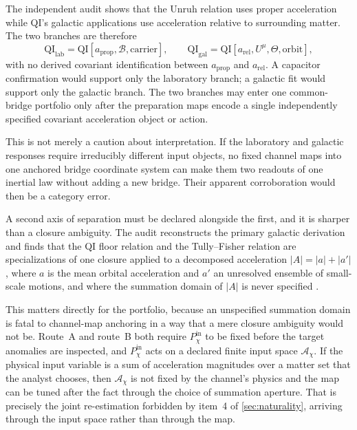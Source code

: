 \documentclass[11pt]{article}
\newcommand{\Bdy}{\mathcal{B}}
\begin{document}
The independent audit shows that the Unruh relation uses proper acceleration while QI's galactic applications use acceleration relative to surrounding matter. The two branches are therefore
\begin{equation}
\mathrm{QI}_{\mathrm{lab}}
=\mathrm{QI}[a_{\mathrm{prop}},\Bdy,\text{carrier}],
\qquad
\mathrm{QI}_{\mathrm{gal}}
=\mathrm{QI}[a_{\mathrm{rel}},U^{\mu},\Theta,\text{orbit}],
\end{equation}
with no derived covariant identification between \(a_{\mathrm{prop}}\) and \(a_{\mathrm{rel}}\). A capacitor confirmation would support only the laboratory branch; a galactic fit would support only the galactic branch. The two branches may enter one common-bridge portfolio only after the preparation maps encode a single independently specified covariant acceleration object or action.

This is not merely a caution about interpretation. If the laboratory and galactic responses require irreducibly different input objects, no fixed channel maps into one anchored bridge coordinate system can make them two readouts of one inertial law without adding a new bridge. Their apparent corroboration would then be a category error.

A second axis of separation must be declared alongside the first, and it is sharper than a closure ambiguity. The audit reconstructs the primary galactic derivation and finds that the QI floor relation and the Tully--Fisher relation are specializations of one closure applied to a decomposed acceleration \(|A|=|a|+|a'|\), where \(a\) is the mean orbital acceleration and \(a'\) an unresolved ensemble of small-scale motions, and where the summation domain of \(|A|\) is never specified \cite{ArellanoQIAudit2026}.

This matters directly for the portfolio, because an unspecified summation domain is fatal to channel-map anchoring in a way that a mere closure ambiguity would not be. Route~A and route~B both require \(P_{\chi}^{\mathrm{in}}\) to be fixed before the target anomalies are inspected, and \(P_{\chi}^{\mathrm{in}}\) acts on a declared finite input space \(\mathcal A_{\chi}\). If the physical input variable is a sum of acceleration magnitudes over a matter set that the analyst chooses, then \(\mathcal A_{\chi}\) is not fixed by the channel's physics and the map can be tuned after the fact through the choice of summation aperture. That is precisely the joint re-estimation forbidden by item~4 of \cref{sec:naturality}, arriving through the input space rather than through the map.
\end{document}
